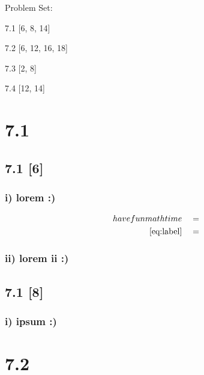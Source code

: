 \documentclass{article}
\begin{document}
{\large \noindent Problem Set:}

\par 7.1 [6, 8, 14]
\par 7.2 [6, 12, 16, 18]
\par 7.3 [2, 8]
\par 7.4 [12, 14]
\vspace{5mm}

\noindent \hrulefill

\section*{7.1}
\setcounter{equation}{0}

\subsection*{7.1 [6]}

\subsubsection*{i) lorem :)}

\begin{align}
    \label{eq:label}
    have fun math time && &=
    \\
    \label{eq:label2}
    \eqref{eq:label} && &=
\end{align}
\subsubsection*{ii) lorem ii :)}

\subsection*{7.1 [8]}

\subsubsection*{i) ipsum :)}

\newpage

\section*{7.2}
\setcounter{equation}{0}
\end{document}
